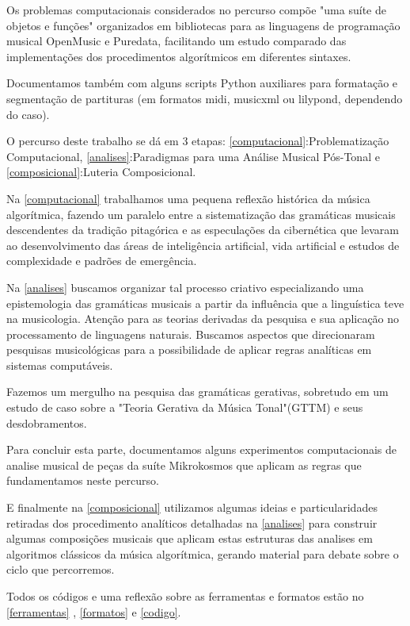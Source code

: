 \documentclass[
	12pt,				%
	openright,			%
	twoside,			%
	a4paper,			%
	english,			%
	french,				%
	spanish,			%
	brazil				%
	]{abntex2}
\begin{document}
Os problemas computacionais considerados no percurso compõe "uma suíte de objetos e funções" organizados em bibliotecas para as linguagens de programação musical OpenMusic e Puredata, facilitando um estudo comparado das implementações dos procedimentos algorítmicos em diferentes sintaxes.

Documentamos também com alguns scripts Python auxiliares para formatação e segmentação de partituras (em formatos midi, musicxml ou lilypond, dependendo do caso).

O percurso deste trabalho se dá em 3 etapas: \autoref{computacional}:Problematização Computacional, \autoref{analises}:Paradigmas para uma Análise Musical Pós-Tonal e \autoref{composicional}:Luteria Composicional.


Na \autoref{computacional} trabalhamos uma pequena reflexão histórica da música algorítmica, fazendo um paralelo entre a sistematização das gramáticas musicais descendentes da tradição pitagórica e as especulações da cibernética que levaram ao desenvolvimento das áreas de inteligência artificial, vida artificial e estudos de complexidade e padrões de emergência.  

Na \autoref{analises} buscamos organizar tal processo criativo especializando uma epistemologia das gramáticas musicais a partir da influência que a linguística teve na musicologia. Atenção para as teorias derivadas da pesquisa  e sua aplicação no processamento de linguagens naturais. Buscamos aspectos que direcionaram pesquisas musicológicas para a possibilidade de aplicar regras analíticas em sistemas computáveis.

Fazemos um mergulho na pesquisa das gramáticas gerativas, sobretudo em um estudo de caso sobre a "Teoria Gerativa da Música Tonal"(GTTM) e seus desdobramentos. 

Para concluir esta parte, documentamos alguns experimentos computacionais de analise musical de peças da suíte Mikrokosmos que aplicam as regras que fundamentamos neste percurso.

E finalmente na \autoref{composicional} utilizamos algumas ideias e particularidades retiradas dos procedimento analíticos detalhadas na \autoref{analises} para construir algumas composições musicais que aplicam estas estruturas das analises em algoritmos clássicos da música algorítmica, gerando material para debate sobre o ciclo que percorremos.

Todos os códigos e uma reflexão sobre as ferramentas e formatos estão no \autoref{ferramentas} , \autoref{formatos} e \autoref{codigo}.
\end{document}
